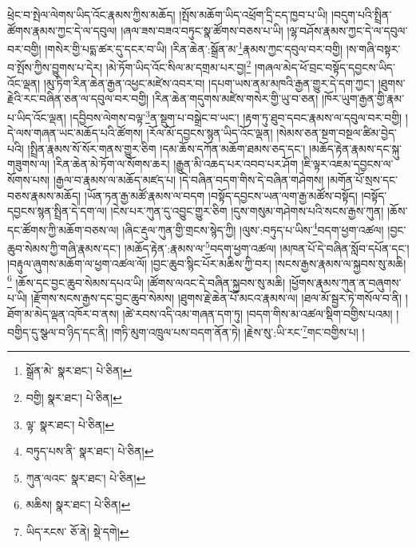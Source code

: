 ཕྲེང་བ་སྤེལ་ལེགས་ཡིད་འོང་རྣམས་ཀྱིས་མཆོད། །སྤོས་མཆོག་ཡིད་འཕྲོག་དྲི་ངད་ཁྱབ་པ་ཡི། །བདུག་པའི་སྤྲིན་ཚོགས་རྣམས་ཀྱང་དེ་ལ་དབུལ། །ཞལ་ཟས་བཟའ་བཏུང་སྣ་ཚོགས་བཅས་པ་ཡི། །ལྷ་བཤོས་རྣམས་ཀྱང་དེ་ལ་དབུལ་བར་བགྱི། །གསེར་གྱི་པདྨ་ཚར་དུ་དངར་བ་ཡི། །རིན་ཆེན་:སྒྲོན་མ་\footnote{སྒྲོན་མེ་  སྣར་ཐང་།  པེ་ཅིན། }རྣམས་ཀྱང་དབུལ་བར་བགྱི། །ས་གཞི་བསྟར་བ་སྤོས་ཀྱིས་བྱུགས་པ་དེར། །མེ་ཏོག་ཡིད་འོང་སིལ་མ་དགྲམ་པར་བྱ།\footnote{བགྱི།  སྣར་ཐང་།  པེ་ཅིན། } །གཞལ་མེད་ཕོ་བྲང་བསྟོད་དབྱངས་ཡིད་འོང་ལྡན། །མུ་ཏིག་རིན་ཆེན་རྒྱན་འཕྱང་མཛེས་འབར་བ། །དཔག་ཡས་ནམ་མཁའི་རྒྱན་གྱུར་དེ་དག་ཀྱང་། །ཐུགས་རྗེའི་རང་བཞིན་ཅན་ལ་དབུལ་བར་བགྱི། །རིན་ཆེན་གདུགས་མཛེས་གསེར་གྱི་ཡུ་བ་ཅན། །ཁོར་ཡུག་རྒྱན་གྱི་རྣམ་པ་ཡིད་འོང་ལྡན། །དབྱིབས་ལེགས་བལྟ་\footnote{ལྟ་  སྣར་ཐང་།  པེ་ཅིན། }ན་སྡུག་པ་བསྒྲེང་བ་ཡང་། །རྟག་ཏུ་ཐུབ་དབང་རྣམས་ལ་དབུལ་བར་བགྱི། །དེ་ལས་གཞན་ཡང་མཆོད་པའི་ཚོགས། །རོལ་མོ་དབྱངས་སྙན་ཡིད་འོང་ལྡན། །སེམས་ཅན་སྔག་བསྔལ་ཚིམ་བྱེད་པའི། །སྤྲིན་རྣམས་སོ་སོར་གནས་གྱུར་ཅིག །དམ་ཆོས་དཀོན་མཆོག་ཐམས་ཅད་དང་། །མཆོད་རྟེན་རྣམས་དང་སྐུ་གཟུགས་ལ། །རིན་ཆེན་མེ་ཏོག་ལ་སོགས་ཆར། །རྒྱུན་མི་འཆད་པར་འབབ་པར་ཤོག །ཇི་ལྟར་འཇམ་དབྱངས་ལ་སོགས་པས། །རྒྱལ་བ་རྣམས་ལ་མཆོད་མཛད་པ། །དེ་བཞིན་བདག་གིས་དེ་བཞིན་གཤེགས། །མགོན་པོ་སྲས་དང་བཅས་རྣམས་མཆོད། །ཡོན་ཏན་རྒྱ་མཚོ་རྣམས་ལ་བདག །བསྟོད་དབྱངས་ཡན་ལག་རྒྱ་མཚོས་བསྟོད། །བསྟོད་དབྱངས་སྙན་སྤྲིན་དེ་དག་ལ། །ངེས་པར་ཀུན་དུ་འབྱུང་གྱུར་ཅིག །དུས་གསུམ་གཤེགས་པའི་སངས་རྒྱས་ཀུན། །ཆོས་དང་ཚོགས་ཀྱི་མཆོག་བཅས་ལ། །ཞིང་རྡུལ་ཀུན་གྱི་གྲངས་སྙེད་ཀྱི། །ལུས་:བཏུད་པ་ཡིས་\footnote{བཏུད་པས་ནི་  སྣར་ཐང་།  པེ་ཅིན། }བདག་ཕྱག་འཚལ། །བྱང་ཆུབ་སེམས་ཀྱི་གཞི་རྣམས་དང་། །མཆོད་རྟེན་:རྣམས་ལ་\footnote{ཀུན་ལའང་  སྣར་ཐང་།  པེ་ཅིན། }བདག་ཕྱག་འཚལ། །མཁན་པོ་དེ་བཞིན་སློབ་དཔོན་དང་། །བརྟུལ་ཞུགས་མཆོག་ལ་ཕྱག་འཚལ་ལོ། །བྱང་ཆུབ་སྙིང་པོར་མཆིས་ཀྱི་བར། །སངས་རྒྱས་རྣམས་ལ་སྐྱབས་སུ་མཆི།\footnote{མཆིས།  སྣར་ཐང་།  པེ་ཅིན། } །ཆོས་དང་བྱང་ཆུབ་སེམས་དཔའ་ཡི། །ཚོགས་ལའང་དེ་བཞིན་སྐྱབས་སུ་མཆི། །ཕྱོགས་རྣམས་ཀུན་ན་བཞུགས་པ་ཡི། །རྫོགས་སངས་རྒྱས་དང་བྱང་ཆུབ་སེམས། །ཐུགས་རྗེ་ཆེན་པོ་མངའ་རྣམས་ལ། །ཐལ་མོ་སྦྱར་ཏེ་གསོལ་བ་ནི། །ཐོག་མ་མེད་ལྡན་འཁོར་བ་ནས། །ཚེ་རབས་འདི་འམ་གཞན་དག་ཏུ། །བདག་གིས་མ་འཚལ་སྡིག་བགྱིས་པའམ། །བགྱིད་དུ་སྩལ་བ་ཉིད་དང་ནི། །གཏི་མུག་འཁྲུལ་པས་བདག་ནོན་ཏེ། །རྗེས་སུ་:ཡི་རང་\footnote{ཡིད་རངས་  ཅོ་ནེ།  སྡེ་དགེ། }གང་བགྱིས་པ། །

